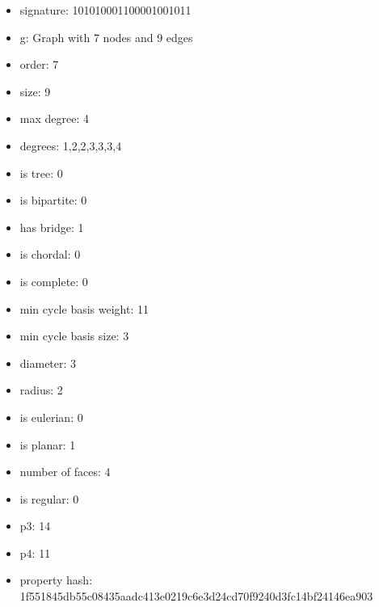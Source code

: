 \begin{itemize}
\item signature: 101010001100001001011
\item g: Graph with 7 nodes and 9 edges
\item order: 7
\item size: 9
\item max degree: 4
\item degrees: 1,2,2,3,3,3,4
\item is tree: 0
\item is bipartite: 0
\item has bridge: 1
\item is chordal: 0
\item is complete: 0
\item min cycle basis weight: 11
\item min cycle basis size: 3
\item diameter: 3
\item radius: 2
\item is eulerian: 0
\item is planar: 1
\item number of faces: 4
\item is regular: 0
\item p3: 14
\item p4: 11
\item property hash: 1f551845db55c08435aadc413e0219c6e3d24cd70f9240d3fc14bf24146ea903
\end{itemize}
\newpage
\begin{figure}
\end{figure}

